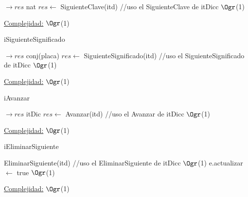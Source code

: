 \begin{Representacion}
\begin{Algoritmos}
\begin{algorithm}[H]
		\begin{algorithmic}[1]
			 $\to res$ nat
			\State $res \leftarrow$ SiguienteClave(itd) //uso el SiguienteClave de itDicc \Comment $\Ogr$(1)
			\EndProcedure 
		\end{algorithmic}
		\underline{Complejidad:} $\Ogr$(1)
	\end{algorithm}
	
	\begin{algorithm}[H]
		\caption{iSiguienteSignificado}
		
		\begin{algorithmic}[1]
			 $\to res$ conj(placa)
			\State $res \leftarrow$ SiguienteSignificado(itd) //uso el SiguienteSignificado de itDicc \Comment $\Ogr$(1)
			\EndProcedure 
		\end{algorithmic}
		\underline{Complejidad:} $\Ogr$(1)
	\end{algorithm}
	
	\begin{algorithm}[H]
		\caption{iAvanzar}
		
		\begin{algorithmic}[1]
			 $\to res$ itDic
			\State $res \leftarrow$ Avanzar(itd) //uso el Avanzar de itDicc \Comment $\Ogr$(1)
			\EndProcedure 
		\end{algorithmic}
		\underline{Complejidad:} $\Ogr$(1)
	\end{algorithm}
	
	\begin{algorithm}[H]
		\caption{iEliminarSiguiente}
		
		\begin{algorithmic}[1]
			\State EliminarSiguiente(itd) //uso el EliminarSiguiente de itDicc \Comment $\Ogr$(1)
			\State e.actualizar $\leftarrow$ true \Comment $\Ogr$(1)
			\EndProcedure 
		\end{algorithmic}
		\underline{Complejidad:} $\Ogr$(1)
	\end{algorithm}	
	
\end{Algoritmos}
\end{Representacion}